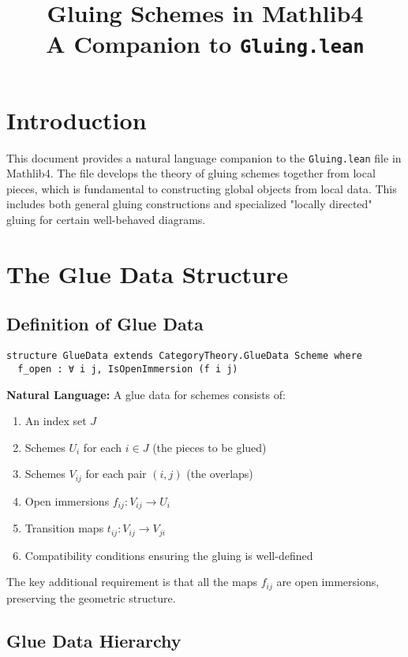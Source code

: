 \documentclass{article}
\title{Gluing Schemes in Mathlib4\\
\large A Companion to \texttt{Gluing.lean}}
\author{}
\date{}
\theoremstyle{definition}
\begin{document}
\maketitle

\section{Introduction}

This document provides a natural language companion to the \texttt{Gluing.lean} file in Mathlib4. The file develops the theory of gluing schemes together from local pieces, which is fundamental to constructing global objects from local data. This includes both general gluing constructions and specialized "locally directed" gluing for certain well-behaved diagrams.

\section{The Glue Data Structure}

\subsection{Definition of Glue Data}

\begin{lstlisting}
structure GlueData extends CategoryTheory.GlueData Scheme where
  f_open : ∀ i j, IsOpenImmersion (f i j)
\end{lstlisting}

\textbf{Natural Language:} A glue data for schemes consists of:
\begin{enumerate}
\item An index set $J$
\item Schemes $U_i$ for each $i \in J$ (the pieces to be glued)
\item Schemes $V_{ij}$ for each pair $(i,j)$ (the overlaps)
\item Open immersions $f_{ij}: V_{ij} \to U_i$
\item Transition maps $t_{ij}: V_{ij} \to V_{ji}$ 
\item Compatibility conditions ensuring the gluing is well-defined
\end{enumerate}

The key additional requirement is that all the maps $f_{ij}$ are open immersions, preserving the geometric structure.

\subsection{Glue Data Hierarchy}
\end{document}
